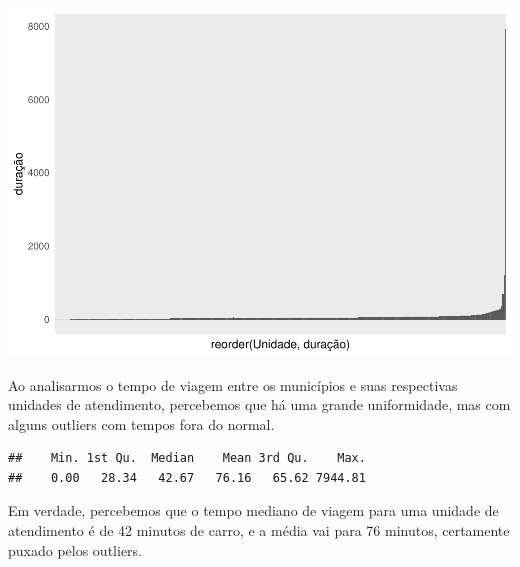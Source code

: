 \documentclass[]{article}
\newenvironment{Shaded}{\begin{snugshade}}{\end{snugshade}}
\newcommand{\DataTypeTok}[1]{\textcolor[rgb]{0.13,0.29,0.53}{#1}}
\newcommand{\DecValTok}[1]{\textcolor[rgb]{0.00,0.00,0.81}{#1}}
\newcommand{\KeywordTok}[1]{\textcolor[rgb]{0.13,0.29,0.53}{\textbf{#1}}}
\newcommand{\NormalTok}[1]{#1}
\newcommand{\OperatorTok}[1]{\textcolor[rgb]{0.81,0.36,0.00}{\textbf{#1}}}
\newcommand{\StringTok}[1]{\textcolor[rgb]{0.31,0.60,0.02}{#1}}
\begin{document}
\includegraphics{trabalho_de_conclusao_files/figure-latex/unnamed-chunk-7-1.pdf}

Ao analisarmos o tempo de viagem entre os municípios e suas respectivas
unidades de atendimento, percebemos que há uma grande uniformidade, mas
com alguns outliers com tempos fora do normal.

\begin{Shaded}
\end{Shaded}

\begin{verbatim}
##    Min. 1st Qu.  Median    Mean 3rd Qu.    Max. 
##    0.00   28.34   42.67   76.16   65.62 7944.81
\end{verbatim}

Em verdade, percebemos que o tempo mediano de viagem para uma unidade de
atendimento é de 42 minutos de carro, e a média vai para 76 minutos,
certamente puxado pelos outliers.

\begin{Shaded}
\end{Shaded}
\end{document}
